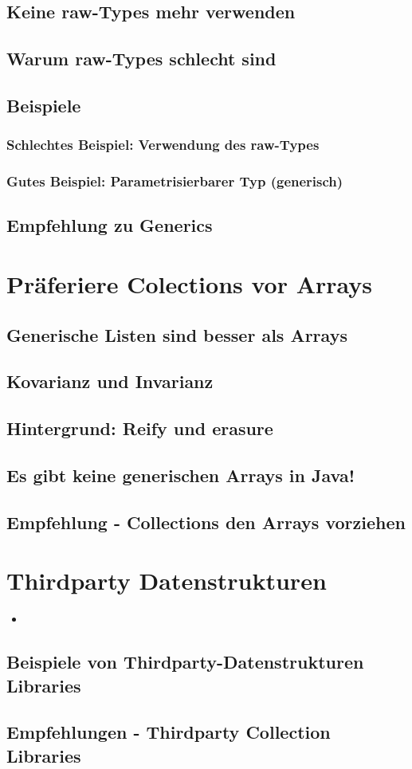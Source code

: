 \subsection{Keine raw-Types mehr verwenden}
\subsection{Warum raw-Types schlecht sind}
\subsection{Beispiele}
\subsubsection{Schlechtes Beispiel: Verwendung des raw-Types}
\subsubsection{Gutes Beispiel: Parametrisierbarer Typ (generisch)}
\subsection{Empfehlung zu Generics}

\section{Präferiere Colections vor Arrays}
\subsection{Generische Listen sind besser als Arrays}
\subsection{Kovarianz und Invarianz}
\subsection{Hintergrund: Reify und erasure}
\subsection{Es gibt keine generischen Arrays in Java!}
\subsection{Empfehlung - Collections den Arrays vorziehen}

\section{Thirdparty Datenstrukturen}
\begin{itemize}
    \item
\end{itemize}
\subsection{Beispiele von Thirdparty-Datenstrukturen Libraries}
\subsection{Empfehlungen - Thirdparty Collection Libraries}